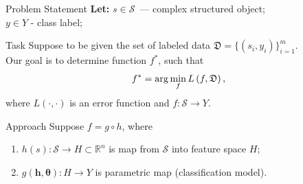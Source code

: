 \documentclass{beamer}
\begin{document}
\begin{frame}{Problem Statement}
	\textbf{Let:} $s \in \mathcal{S}$~--- complex structured object;\\
	\hspace{24pt}$y \in Y$ - class label;
	\vfill
	\begin{block}{Task}
	Suppose to be given the set of labeled data $\mathfrak{D} = \{(s_i, y_i)\}_{i=1}^m$. \\Our goal is to determine function $f^*$, such that \vspace{-0.2cm}$$f^* = \arg \min_f L\left(f, \mathfrak{D}\right),\vspace{-0.3cm}$$ where $L(\cdot, \cdot)$ is an error function and $f: \mathcal{S} \rightarrow Y$.
	\end{block}
	\vfill
	\begin{block}{Approach}
		Suppose $f = g \circ h$, where
		\begin{enumerate}
			\item $h(s): \mathcal{S} \rightarrow H \subset \mathbb{R}^n$ is map from $\mathcal{S}$ into feature space $H$;
			\item $g(\bm{h}, \bm\theta): H \rightarrow Y$ is parametric map (classification model).
		\end{enumerate}
	\end{block}
\end{frame}
\end{document}
